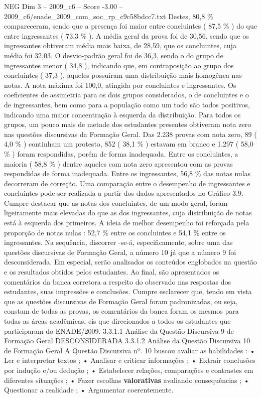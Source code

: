 \begin{textsample}{NEG Dim 3 – 2009\_c6 – Score -3.00 – 2009\_c6/enade\_2009\_com\_soc\_rp\_c9c58bdcc7.txt}
Destes, 80,8 \% compareceram, sendo que a presença foi maior entre concluintes ( 87,5 \% ) do que entre ingressantes ( 73,3 \% ).
A média geral da prova foi de 30,56, sendo que os ingressantes obtiveram média mais baixa, de 28,59, que os concluintes, cuja média foi 32,03.
O desvio-padrão geral foi de 36,3, sendo o do grupo de ingressantes menor ( 34,8 ), indicando que, em contraposição ao grupo dos concluintes ( 37,3 ), aqueles possuíram uma distribuição mais homogênea nas notas.
A nota máxima foi 100,0, atingida por concluintes e ingressantes.
Os coeficientes de assimetria para os dois grupos considerados, o de concluintes e o de ingressantes, bem como para a população como um todo são todos positivos, indicando uma maior concentração à esquerda da distribuição.
Para todos os grupos, um pouco mais de metade dos estudantes presentes obtiveram nota zero nas questões discursivas da Formação Geral.
Das 2.238 provas com nota zero, 89 ( 4,0 \% ) continham um protesto, 852 ( 38,1 \% ) estavam em branco e 1.297 ( 58,0 \% ) foram respondidas, porém de forma inadequada.
Entre os concluintes, a maioria ( 58,8 \% ) dentre aqueles com nota zero apresentou com as provas respondidas de forma inadequada.
Entre os ingressantes, 56,8 \% das notas nulas decorreram de correção.
Uma comparação entre o desempenho de ingressantes e concluintes pode ser realizada a partir dos dados apresentados no Gráfico 3.9.
Cumpre destacar que as notas dos concluintes, de um modo geral, foram ligeiramente mais elevadas do que as dos ingressantes, cuja distribuição de notas está à esquerda dos primeiros.
A ideia de melhor desempenho foi reforçada pela proporção de notas nulas : 52,7 \% entre os concluintes e 54,1 \% entre os ingressantes.
Na sequência, discorrer -se-á, especificamente, sobre uma das questões discursivas de Formação Geral, a número 10 já que a número 9 foi desconsiderada.
Em especial, serão analisados os conteúdos englobados na questão e os resultados obtidos pelos estudantes.
Ao final, são apresentados os comentários da banca corretora a respeito do observado nas respostas dos estudantes, suas impressões e conclusões.
Cumpre esclarecer que, tendo em vista que as questões discursivas de Formação Geral foram padronizadas, ou seja, constam de todas as provas, os comentários da banca foram os mesmos para todas as áreas acadêmicas, eis que direcionados a todos os estudantes que participaram do ENADE/2009. 3.3.1.1 Análise da Questão Discursiva 9 de Formação Geral DESCONSIDERADA 3.3.1.2 Análise da Questão Discursiva 10 de Formação Geral A Questão Discursiva nº. 10 buscou avaliar as habilidades : • Ler e interpretar textos ; • Analisar e criticar informações ; • Extrair conclusões por indução e/ou dedução ; • Estabelecer relações, comparações e contrastes em diferentes situações ; • Fazer escolhas \textbf{valorativas} avaliando consequências ; • Questionar a realidade ; • Argumentar coerentemente.

\end{textsample}
